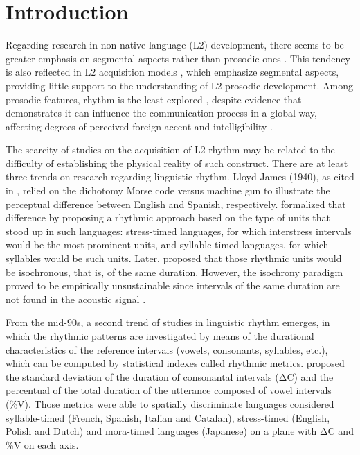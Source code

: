 \section{Introduction}
Regarding research in non-native language (L2) development, there seems to be
greater emphasis on segmental aspects rather than prosodic ones \citep{li2014,thomson2015}.
This tendency is also reflected in L2
acquisition models \citep{flege2021,best2007}, 
which emphasize segmental aspects, providing little support to the understanding of L2 prosodic
development. 
Among prosodic features, rhythm is the least explored \citep{cumming2010,gut2012,whitworth_speech_2002},
despite evidence that demonstrates it can influence the communication process in a global way, 
affecting degrees of perceived foreign accent and intelligibility \citep{silva2020}.

The scarcity of studies on the acquisition of L2 rhythm may be related to the
difficulty of establishing the physical reality of such construct. There are at
least three trends on research regarding linguistic rhythm. Lloyd James (1940),
as cited in \citet{abercrombie1971}, relied on the dichotomy Morse code versus
machine gun to illustrate the perceptual difference between English and
Spanish, respectively. \citet{pike1945} formalized that difference by proposing a
rhythmic approach based on the type of units that stood up in such languages:
stress-timed languages, for which interstress intervals would be the most
prominent units, and syllable-timed languages, for which syllables would be
such units. Later, \citet{abercrombie1971} proposed that those rhythmic units would
be isochronous, that is, of the same duration. However, the isochrony paradigm
proved to be empirically unsustainable since intervals of the same duration are
not found in the acoustic signal \citep{cumming2010}.

From the mid-90s, a second trend of studies in linguistic rhythm emerges, in
which the rhythmic patterns are investigated by means of the durational
characteristics of the reference intervals (vowels, consonants, syllables,
etc.), which can be computed by statistical indexes called rhythmic metrics.
\citet{ramus1999} proposed the standard deviation of the duration
of consonantal intervals (ΔC) and the percentual of the total duration of the
utterance composed of vowel intervals (\%V). Those metrics were able to
spatially discriminate languages considered syllable-timed (French, Spanish,
Italian and Catalan), stress-timed (English, Polish and Dutch) and mora-timed
languages (Japanese) \citep{ladefoged1975} on a plane with ΔC and \%V on each axis.%

